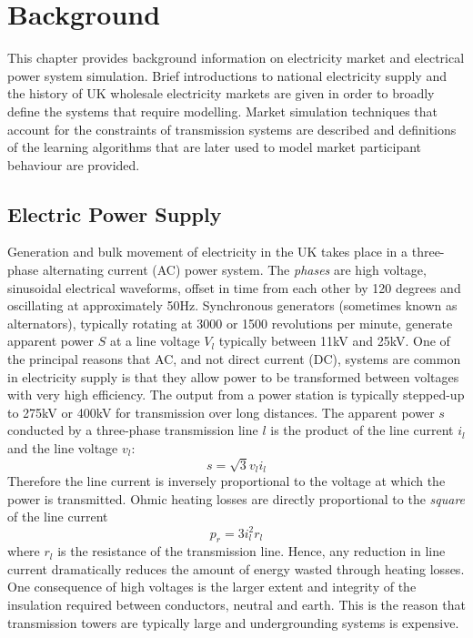 \chapter{Background}
\label{ch:background}
This chapter provides background information on electricity market and
electrical power system simulation. Brief introductions to national electricity
supply and the history of UK wholesale electricity markets are given in order to
broadly define the systems that require modelling. Market simulation techniques
that account for the constraints of transmission systems are described and
definitions of the learning algorithms that are later used to model
market participant behaviour are provided.

\section{Electric Power Supply}


Generation and bulk movement of electricity in the UK takes place in a
three-phase alternating current (AC) power system.  The \textit{phases} are high
voltage, sinusoidal electrical waveforms, offset in time from each other by 120
degrees and oscillating at approximately 50Hz. Synchronous generators (sometimes
known as alternators), typically rotating at 3000 or 1500 revolutions per
minute, generate apparent power $S$ at a line voltage $V_l$ typically between
11kV and 25kV.  One of the principal reasons that AC, and not direct current
(DC), systems are common in electricity supply is that they allow power to be
transformed between voltages with very high efficiency. The output from a power
station is typically stepped-up to 275kV or 400kV for transmission over long
distances. The apparent power $s$ conducted by a three-phase transmission line
$l$ is the product of the line current $i_l$ and the line voltage $v_l$:
\begin{equation}
s = \sqrt{3} v_l i_l
\end{equation}
Therefore the line current is inversely proportional to the voltage at which
the power is transmitted. Ohmic heating losses are directly proportional to the
\textit{square} of the line current
\begin{equation}
p_{r} = 3 i_l^2 r_l
\end{equation}
where $r_l$ is the resistance of the transmission line.  Hence, any reduction in
line current dramatically reduces the amount of energy wasted through heating
losses.  One consequence of high voltages is the larger extent and integrity
of the insulation required between conductors, neutral and earth.  This is the
reason that transmission towers are typically large and undergrounding systems
is expensive.

